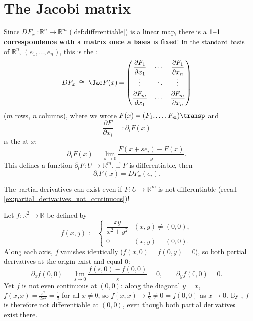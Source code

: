 
\section{The Jacobi matrix}
\label{sec:jacobi_matrix}

Since $DF_{x_0} : \mathbb{R}^n \to \mathbb{R}^m$ (\cref{def:differentiable}) is a linear map, there is a \textbf{1--1
correspondence with a matrix once a basis is fixed}! In the standard basis of $\mathbb{R}^n$,
$(e_1,\dots,e_n)$, this is the  :
\[DF_x \;\cong\; \Jac F(x) = \begin{pmatrix} \dfrac{\partial F_1}{\partial x_1} & \cdots & \dfrac{\partial F_1}{\partial x_n} \\[1ex] \vdots & \ddots & \vdots \\[1ex] \dfrac{\partial F_m}{\partial x_1} & \cdots & \dfrac{\partial F_m}{\partial x_n}\end{pmatrix}\]
($m$ rows, $n$ columns), where we wrote $F(x) = (F_1, \dots, F_m)\transp$ and
\[\frac{\partial F}{\partial x_i} =: \partial_i F(x)\]
is the   at $x$:
\[\partial_i F(x) = \lim_{s\to 0}\frac{F(x+se_i)-F(x)}{s}.\]
This defines a function $\partial_i F : U \to \mathbb{R}^m$. If $F$ is differentiable, then
\[\partial_i F(x) = DF_x(e_i).\]

\begin{importantremark}
The partial derivatives can exist even if $F : U \to \mathbb{R}^m$ is not differentiable (recall \cref{ex:partial_derivatives_not_continuous})!
\end{importantremark}

\begin{aiexample}
\label{ex:partial_derivatives_not_continuous}
Let $f : \mathbb{R}^2 \to \mathbb{R}$ be defined by
\[f(x,y) := \begin{cases} \dfrac{xy}{x^2+y^2} & (x,y) \neq (0,0), \\ 0 & (x,y) = (0,0). \end{cases}\]
Along each axis, $f$ vanishes identically ($f(x,0) = f(0,y) = 0$), so both partial derivatives at
the origin exist and equal $0$:
\[\partial_x f(0,0) = \lim_{s\to 0}\frac{f(s,0)-f(0,0)}{s} = 0, \qquad \partial_y f(0,0) = 0.\]
Yet $f$ is not even continuous at $(0,0)$: along the diagonal $y=x$, $f(x,x) = \tfrac{x^2}{2x^2} =
\tfrac12$ for all $x \neq 0$, so $f(x,x) \to \tfrac12 \neq 0 = f(0,0)$ as $x \to 0$. By
, $f$ is therefore not differentiable at $(0,0)$,
even though both partial derivatives exist there.
\end{aiexample}


